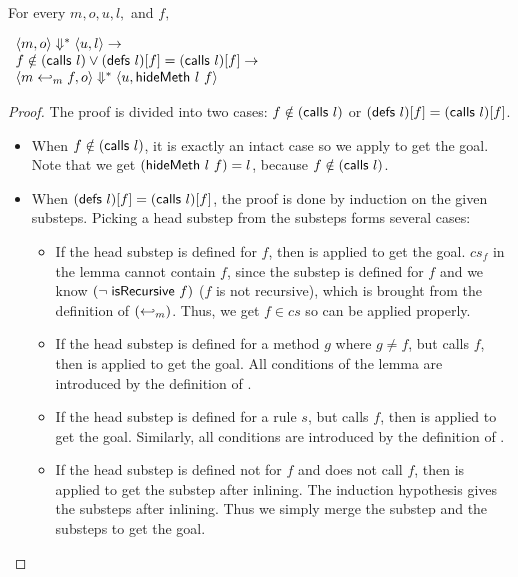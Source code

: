 \begin{lemma}
  \label{lem-inlinedmm}
  \mbox{}\\
  For every $m, o, u, l,$ and $f,$
  \begin{center}
    \begin{math}
      \begin{array}{l}
        \langle m, o \rangle \Downarrow^{\ast} \langle u, l \rangle \to \\
        f \notin (\textsf{calls}\ l) \vee (\textsf{defs}\ l)[f] = (\textsf{calls}\ l)[f] \to \\
        \langle m \hookleftarrow_{m}{} f, o \rangle \Downarrow^{\ast} \langle u, \textsf{hideMeth}{}\ l\ f \rangle
      \end{array}
    \end{math}
  \end{center}
\end{lemma}
\begin{proof}
  The proof is divided into two cases: $f \notin (\textsf{calls}\ l)$ or
  $(\textsf{defs}\ l)[f] = (\textsf{calls}\ l)[f]$.
  \begin{itemize}
  \item When $f \notin (\textsf{calls}\ l)$, it is exactly an intact case so
    we apply  to get the goal. Note that
    we get $(\textsf{hideMeth}{}\ l\ f) = l$, because $f \notin (\textsf{calls}\ l)$.
  \item When $(\textsf{defs}\ l)[f] = (\textsf{calls}\ l)[f]$, the proof is done
    by induction on the given substeps. Picking a head substep from
    the substeps forms several cases:
    \begin{itemize}
    \item If the head substep is defined for $f$, then
       is applied to get the goal. $cs_f$
      in the lemma cannot contain $f$, since the substep is defined
      for $f$ and we know $(\neg\; \textsf{isRecursive}\ f)$ ($f$ is not recursive),
      which is brought from the definition of $(\hookleftarrow_{m})$.
      Thus, we get $f \in cs$ so  can be
      applied properly.
    \item If the head substep is defined for a method $g$ where $g
      \neq f$, but calls $f$, then  is
      applied to get the goal. All conditions of the lemma are
      introduced by the definition of \Substeps{}.
    \item If the head substep is defined for a rule $s$, but calls
      $f$, then  is applied to get the
      goal. Similarly, all conditions are introduced by the definition
      of \Substeps{}.
    \item If the head substep is defined not for $f$ and does not call
      $f$, then  is applied to
      get the substep after inlining. The induction hypothesis gives
      the substeps after inlining. Thus we simply merge the substep
      and the substeps to get the goal.
    \end{itemize}
  \end{itemize}
\end{proof}


